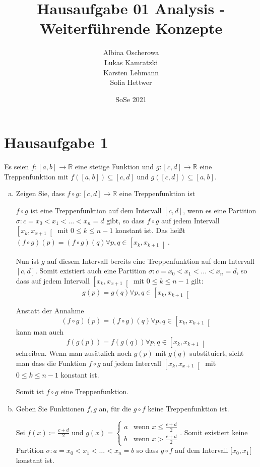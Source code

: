 \documentclass{article}
\author{Albina Oscherowa \\ Lukas Kamratzki \\ Karsten Lehmann \\ Sofia Hettwer}
\date{SoSe 2021}
\title{Hausaufgabe 01 Analysis - Weiterführende Konzepte}
\begin{document}
\section*{}
\section*{Hausaufgabe 1}

Es seien $f \colon [a, b] \to \mathbb{R}$ eine stetige Funktion und
$g \colon [c, d] \to \mathbb{R}$ eine Treppenfunktion mit
$f([a, b]) \subseteq [c, d]$ und $g([c, d]) \subseteq [a, b]$.

\begin{enumerate}[a)]
\item Zeigen Sie, dass $f \circ g \colon [c, d] \to \mathbb{R}$ eine
  Treppenfunktion ist

  $f \circ g$ ist eine Treppenfunktion auf dem Intervall $[c, d]$, wenn es
  eine Partition $\sigma \colon c = x_0 < x_1 < \ldots < x_n = d$ gibt, so dass
  $f \circ g$ auf jedem Intervall $\left[x_k, x_{x + 1}\right[$ mit
  $0 \leq k \leq n - 1$ konstant ist.
  Das heißt $(f \circ g)(p) = (f \circ g)(q) \forall p, q \in \left[ x_k, x_{k + 1}\right[$.

  Nun ist $g$ auf diesem Intervall bereits eine Treppenfunktion auf dem
  Intervall $[c, d]$.
  Somit existiert auch eine Partition
  $\sigma \colon c = x_0 < x_1 < \ldots < x_n = d$, so dass auf jedem Intervall
  $\left[x_k, x_{x + 1}\right[$ mit $0 \leq k \leq n - 1$ gilt:
  \[
    g(p) = g(q) \forall p, q \in \left[ x_k, x_{k + 1}\right[
  \]

  Anstatt der Annahme
  \[
    (f \circ g)(p) = (f \circ g)(q) \forall p, q \in \left[ x_k, x_{k + 1}\right[
  \]
  kann man auch
  \[
    f(g(p)) = f(g(q)) \forall p, q \in \left[ x_k, x_{k + 1}\right[
  \]
  schreiben. Wenn man zusätzlich noch $g(p)$ mit $g(q)$ substituiert, sieht man
  dass die Funktion
  $f \circ g$ auf jedem Intervall $\left[x_k, x_{x + 1}\right[$ mit
  $0 \leq k \leq n - 1$ konstant ist.

  Somit ist $f \circ g$ eine Treppenfunktion.
  
\item Geben Sie Funktionen $f, g$ an, für die $g \circ f$ keine
  Treppenfunktion ist.

  Sei $f(x) \coloneqq \frac{c + d}{2}$ und $g(x) = \begin{cases}
    a & \text{wenn $x \leq \frac{c + d}{2}$} \\
    b & \text{wenn $x > \frac{c + d}{2}$}
  \end{cases}$.
  Somit existiert keine Partition
  $\sigma \colon a = x_0 < x_1 < \ldots < x_n = b$
  so dass $g \circ f$ auf dem Intervall $[x_0, x_1[$ konstant ist.
\end{enumerate}
\newpage
\end{document}
